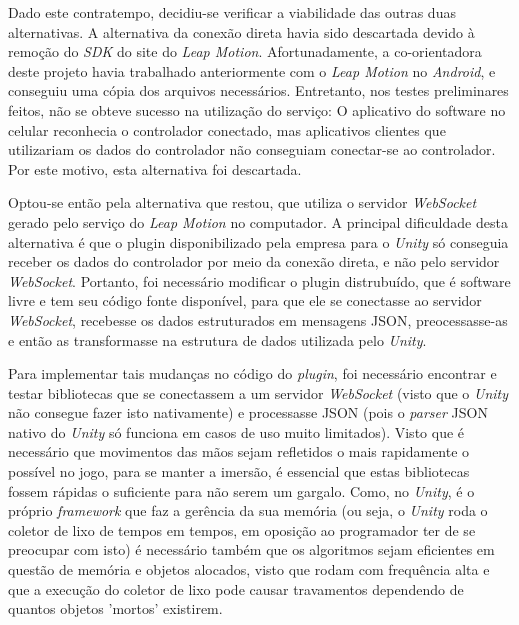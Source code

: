 Dado este contratempo, decidiu-se verificar a viabilidade das outras duas 
alternativas. A alternativa da conexão direta havia sido descartada devido
à remoção do \textit{SDK} do site do \textit{Leap Motion}. 
Afortunadamente, a co-orientadora 
deste projeto havia trabalhado anteriormente com o \textit{Leap Motion} 
no \textit{Android}, e conseguiu uma cópia dos arquivos necessários. 
Entretanto, nos testes preliminares feitos, não se obteve sucesso na 
utilização do serviço: O aplicativo do software no celular reconhecia o 
controlador conectado, mas aplicativos clientes que utilizariam os 
dados do controlador não conseguiam conectar-se ao controlador. Por este 
motivo, esta alternativa foi descartada.

Optou-se então pela alternativa que restou, que utiliza o servidor
\textit{WebSocket} gerado pelo serviço do \textit{Leap Motion} no computador. 
A principal dificuldade desta alternativa é que o plugin disponibilizado 
pela empresa para o \textit{Unity} só conseguia receber os dados do controlador 
por meio da conexão direta, e não pelo servidor \textit{WebSocket}. Portanto, foi 
necessário modificar o plugin distrubuído, que é software livre e tem seu 
código fonte disponível, para que ele se conectasse ao servidor \textit{WebSocket}, 
recebesse os dados estruturados em mensagens JSON, preocessasse-as e 
então as transformasse na estrutura de dados utilizada pelo \textit{Unity}.

Para implementar tais mudanças no código do \textit{plugin}, foi necessário encontrar 
e testar bibliotecas que se conectassem a um servidor
\textit{WebSocket} (visto que o \textit{Unity} não consegue fazer 
isto nativamente) e processasse JSON (pois o \textit{parser} JSON nativo 
do \textit{Unity} só funciona em casos de uso muito limitados). Visto que 
é necessário que movimentos das mãos sejam refletidos o mais rapidamente 
o possível no jogo, para se manter a imersão, é essencial que 
estas bibliotecas fossem rápidas o suficiente para não serem um gargalo. 
Como, no \textit{Unity}, é o próprio \textit{framework}
que faz a gerência da sua memória (ou seja, o \textit{Unity} roda o coletor de 
lixo de tempos em tempos, em oposição ao programador ter de se preocupar com isto)
é necessário também que os algoritmos sejam eficientes em questão de memória 
e objetos alocados, visto que rodam com frequência alta e que a execução do
coletor de lixo pode causar travamentos dependendo de quantos objetos 'mortos' 
existirem.

